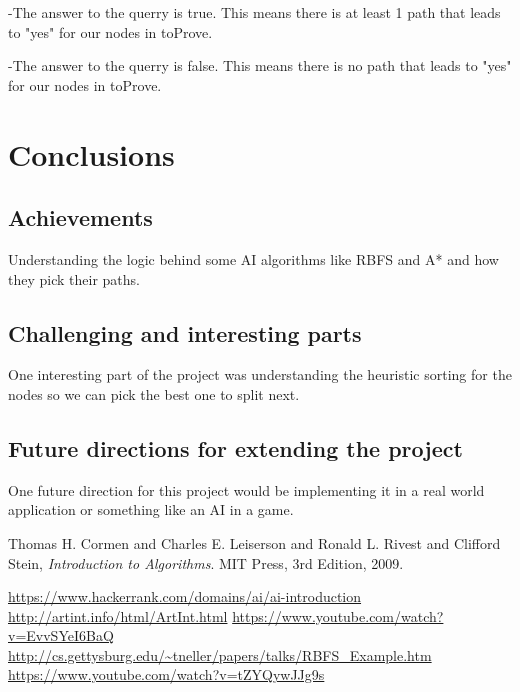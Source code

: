 \documentclass{article}
\begin{document}
\begin{itemize}
-The answer to the querry is true. This means there is at least 1 path that leads to "yes" for our nodes in toProve.

-The answer to the querry is false. This means there is no path that leads to "yes" for our nodes in toProve.
\pagebreak


\end{itemize}


\section{Conclusions}


\subsection{Achievements}
Understanding the logic behind some AI algorithms like RBFS and A* and how they pick their paths.
\subsection{Challenging and interesting	parts}
\sloppy
One interesting part of the project was understanding the heuristic sorting for the nodes so we can pick the best one to split next.
\linebreak
\subsection{Future directions for extending the project} 
One future direction for this project would be implementing it in a real world application or something like an AI in a game.
\pagebreak

\begin{thebibliography}{9}
	
	Thomas H. Cormen and Charles E. Leiserson and Ronald L. Rivest and Clifford Stein,
	\emph{Introduction to Algorithms}.
	MIT Press,
	3rd Edition,
	2009.
	
	\url{https://www.hackerrank.com/domains/ai/ai-introduction} \linebreak
	\url{http://artint.info/html/ArtInt.html}
	\linebreak
	\url{https://www.youtube.com/watch?v=EvvSYeI6BaQ}
	\linebreak
	\url{http://cs.gettysburg.edu/~tneller/papers/talks/RBFS_Example.htm}
		\linebreak
		\url{https://www.youtube.com/watch?v=tZYQywJJg9s}
		\linebreak
\end{thebibliography}
\end{document}

